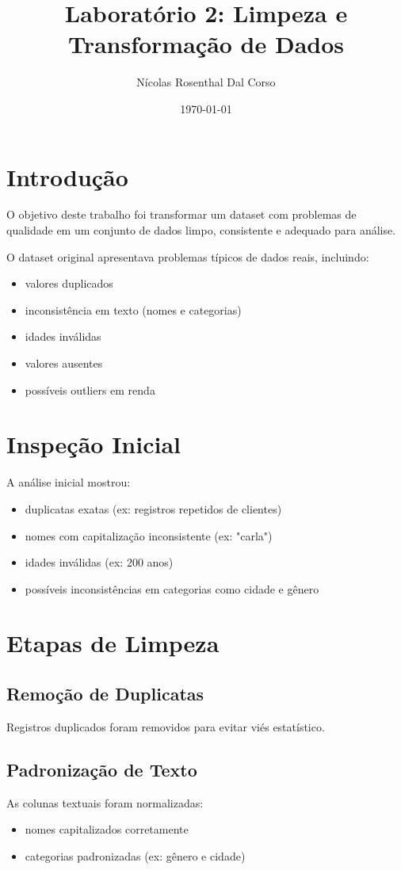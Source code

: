 \documentclass[11pt]{article}
\author{Nícolas Rosenthal Dal Corso}
\date{\today}
\title{Laboratório 2: Limpeza e Transformação de Dados}
\begin{document}
\maketitle
\tableofcontents

\newpage
\section{Introdução}
\label{sec:org3dd683a}
O objetivo deste trabalho foi transformar um dataset com problemas de qualidade em um conjunto de dados limpo, consistente e adequado para análise.

O dataset original apresentava problemas típicos de dados reais, incluindo:
\begin{itemize}
\item valores duplicados
\item inconsistência em texto (nomes e categorias)
\item idades inválidas
\item valores ausentes
\item possíveis outliers em renda
\end{itemize}
\section{Inspeção Inicial}
\label{sec:orgb004d26}
A análise inicial mostrou:
\begin{itemize}
\item duplicatas exatas (ex: registros repetidos de clientes)
\item nomes com capitalização inconsistente (ex: "carla")
\item idades inválidas (ex: 200 anos)
\item possíveis inconsistências em categorias como cidade e gênero
\end{itemize}
\section{Etapas de Limpeza}
\label{sec:orgd5a4fee}

\subsection{Remoção de Duplicatas}
\label{sec:orgb5b4b41}
Registros duplicados foram removidos para evitar viés estatístico.
\subsection{Padronização de Texto}
\label{sec:orgf04be0b}
As colunas textuais foram normalizadas:
\begin{itemize}
\item nomes capitalizados corretamente
\item categorias padronizadas (ex: gênero e cidade)
\end{itemize}
\end{document}
